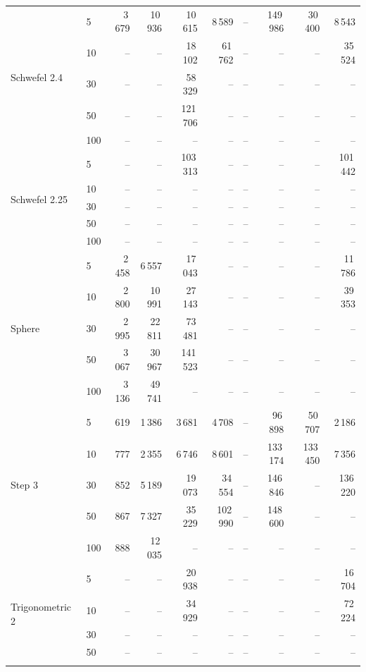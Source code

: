 {\begin{longtable}{llrrrrrrrr}
\midrule
\multirow{5}{*}{Schwefel 2.4} & 5 & 3\,679 & 10\,936 & 10\,615 & 8\,589 & -- & 149\,986 & 30\,400 & 8\,543 \\*
 & 10 & -- & -- & 18\,102 & 61\,762 & -- & -- & -- & 35\,524 \\*
 & 30 & -- & -- & 58\,329 & -- & -- & -- & -- & -- \\*
 & 50 & -- & -- & 121\,706 & -- & -- & -- & -- & -- \\*
 & 100 & -- & -- & -- & -- & -- & -- & -- & -- \\
\midrule
\multirow{5}{*}{Schwefel 2.25} & 5 & -- & -- & 103\,313 & -- & -- & -- & -- & 101\,442 \\*
 & 10 & -- & -- & -- & -- & -- & -- & -- & -- \\*
 & 30 & -- & -- & -- & -- & -- & -- & -- & -- \\*
 & 50 & -- & -- & -- & -- & -- & -- & -- & -- \\*
 & 100 & -- & -- & -- & -- & -- & -- & -- & -- \\
\midrule
\multirow{5}{*}{Sphere} & 5 & 2\,458 & 6\,557 & 17\,043 & -- & -- & -- & -- & 11\,786 \\*
 & 10 & 2\,800 & 10\,991 & 27\,143 & -- & -- & -- & -- & 39\,353 \\*
 & 30 & 2\,995 & 22\,811 & 73\,481 & -- & -- & -- & -- & -- \\*
 & 50 & 3\,067 & 30\,967 & 141\,523 & -- & -- & -- & -- & -- \\*
 & 100 & 3\,136 & 49\,741 & -- & -- & -- & -- & -- & -- \\
\midrule
\multirow{5}{*}{Step 3} & 5 & 619 & 1\,386 & 3\,681 & 4\,708 & -- & 96\,898 & 50\,707 & 2\,186 \\*
 & 10 & 777 & 2\,355 & 6\,746 & 8\,601 & -- & 133\,174 & 133\,450 & 7\,356 \\*
 & 30 & 852 & 5\,189 & 19\,073 & 34\,554 & -- & 146\,846 & -- & 136\,220 \\*
 & 50 & 867 & 7\,327 & 35\,229 & 102\,990 & -- & 148\,600 & -- & -- \\*
 & 100 & 888 & 12\,035 & -- & -- & -- & -- & -- & -- \\
\midrule
\multirow{5}{*}{Trigonometric 2} & 5 & -- & -- & 20\,938 & -- & -- & -- & -- & 16\,704 \\*
 & 10 & -- & -- & 34\,929 & -- & -- & -- & -- & 72\,224 \\*
 & 30 & -- & -- & -- & -- & -- & -- & -- & -- \\*
 & 50 & -- & -- & -- & -- & -- & -- & -- & -- \\*

\end{longtable}}
